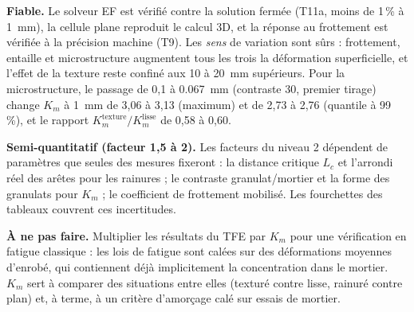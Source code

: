 \begin{encadre}
\textbf{Fiable.} Le solveur EF est vérifié contre la solution fermée (T11a, moins de 1\,\% à
\SI{1}{mm}), la cellule plane reproduit le calcul 3D, et la réponse au frottement est vérifiée à
la précision machine (T9). Les \emph{sens} de variation sont sûrs : frottement, entaille et
microstructure augmentent tous les trois la déformation superficielle, et l'effet de la texture
reste confiné aux 10 à \SI{20}{mm} supérieurs. Pour la microstructure, le passage de 0,1 à \SI{0.067}{mm} (contraste 30, premier tirage)
change $K_m$ à \SI{1}{mm} de 3,06 à 3,13 (maximum) et de
2,73 à 2,76 (quantile à 99\,\%), et le rapport
$K_m^{\text{texture}}/K_m^{\text{lisse}}$ de 0,58 à 0,60.

\textbf{Semi-quantitatif (facteur 1,5 à 2).} Les facteurs du niveau 2 dépendent de paramètres
que seules des mesures fixeront : la distance critique $L_c$ et l'arrondi réel des arêtes pour
les rainures ; le contraste granulat/mortier et la forme des granulats pour $K_m$ ; le coefficient
de frottement mobilisé. Les fourchettes des tableaux couvrent ces incertitudes.

\textbf{À ne pas faire.} Multiplier les résultats du TFE par $K_m$ pour une vérification en
fatigue classique : les lois de fatigue sont calées sur des déformations moyennes d'enrobé, qui
contiennent déjà implicitement la concentration dans le mortier. $K_m$ sert à comparer des
situations entre elles (texturé contre lisse, rainuré contre plan) et, à terme, à un critère
d'amorçage calé sur essais de mortier.
\end{encadre}

